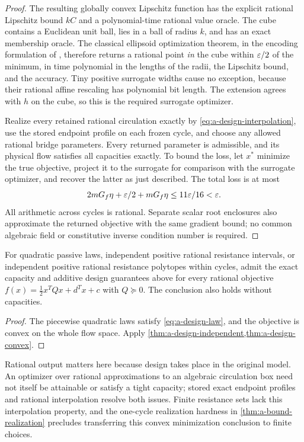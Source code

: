 \begin{proof}
The resulting globally convex Lipschitz function has the explicit
rational Lipschitz bound $kC$ and a polynomial-time rational value
oracle. The cube contains a Euclidean unit ball, lies in a ball of radius
$k$, and has an exact membership oracle.  The classical ellipsoid
optimization theorem, in the encoding formulation of
\citet[Theorem 2.5.9 and Section 2.5.1]{dadush2012-integer-programming},
therefore returns a rational point \emph{in} the cube within
$\varepsilon/2$ of the minimum, in time polynomial in the lengths of the radii,
the Lipschitz bound, and the accuracy.  Tiny positive surrogate widths
cause no exception, because their rational affine rescaling has
polynomial bit length.  The extension agrees with $h$ on the cube, so
this is the required surrogate optimizer.

Realize every retained rational circulation exactly by
\eqref{eq:a-design-interpolation}, use the stored endpoint
profile on each frozen cycle, and choose any allowed rational bridge
parameters.  Every returned parameter is admissible, and its
physical flow satisfies all capacities exactly.  To bound the loss,
let $x^*$ minimize the true objective, project it to the surrogate for
comparison with the surrogate optimizer, and recover the latter as just
described.  The total loss is at most
\[
 2mG_f\eta+\varepsilon/2+mG_f\eta
       \le11\varepsilon/16<\varepsilon.
\]
All arithmetic across cycles is rational.  Separate scalar root
enclosures also approximate the returned objective with the same
gradient bound; no common algebraic field or constitutive inverse
condition number is required.
\end{proof}

\begin{corollary}
\label{cor:a-design-quadratic}
For quadratic passive laws, independent positive rational resistance
intervals, or independent positive rational resistance polytopes
within cycles, admit the exact capacity and additive design guarantees
above for every rational objective
$f(x)=\tfrac12 x^TQx+d^Tx+c$ with $Q\succeq0$.
The conclusion also holds without capacities.
\end{corollary}
\begin{proof}
The piecewise quadratic laws satisfy \eqref{eq:a-design-law}, and the
objective is convex on the whole flow space.  Apply
\cref{thm:a-design-independent,thm:a-design-convex}.
\end{proof}

Rational output matters here because design takes place in the
original model.  An optimizer over rational approximations to an
algebraic circulation box need not itself be attainable or satisfy a
tight capacity; stored exact endpoint profiles and rational
interpolation resolve both issues.  Finite resistance sets lack this
interpolation property, and the one-cycle realization hardness in
\cref{thm:a-bound-realization} precludes transferring this convex
minimization conclusion to finite choices.

